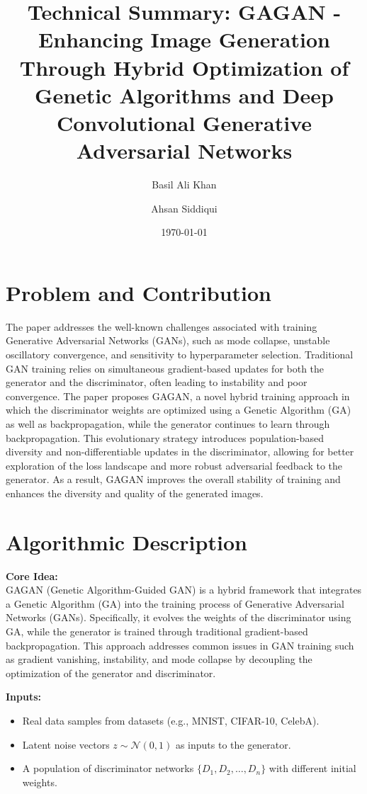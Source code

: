 \documentclass[a4paper,12pt]{article}
\title{Technical Summary: GAGAN - Enhancing Image Generation Through Hybrid Optimization of Genetic Algorithms and Deep Convolutional Generative Adversarial Networks}
\author{Basil Ali Khan \and Ahsan Siddiqui}
\date{\today}
\begin{document}
\maketitle

\section*{Problem and Contribution}
The paper addresses the well-known challenges associated with training Generative Adversarial Networks (GANs), such as  mode collapse, unstable oscillatory convergence, and sensitivity to hyperparameter selection. Traditional GAN training relies on simultaneous gradient-based updates for both the generator and the discriminator, often leading to instability and poor convergence. The paper proposes GAGAN, a novel hybrid training approach in which the discriminator weights are optimized using a Genetic Algorithm (GA) as well as backpropagation, while the generator continues to learn through backpropagation. This evolutionary strategy introduces population-based diversity and non-differentiable updates in the discriminator, allowing for better exploration of the loss landscape and more robust adversarial feedback to the generator. As a result, GAGAN improves the overall stability of training and enhances the diversity and quality of the generated images.

\section*{Algorithmic Description}

\textbf{Core Idea:} \\
GAGAN (Genetic Algorithm-Guided GAN) is a hybrid framework that integrates a Genetic Algorithm (GA) into the training process of Generative Adversarial Networks (GANs). Specifically, it evolves the weights of the discriminator using GA, while the generator is trained through traditional gradient-based backpropagation. This approach addresses common issues in GAN training such as gradient vanishing, instability, and mode collapse by decoupling the optimization of the generator and discriminator.

\vspace{0.5em}
\textbf{Inputs:}
\begin{itemize}
    \item Real data samples from datasets (e.g., MNIST, CIFAR-10, CelebA).
    \item Latent noise vectors $z \sim \mathcal{N}(0, 1)$ as inputs to the generator.
    \item A population of discriminator networks $\{D_1, D_2, \ldots, D_n\}$ with different initial weights.
\end{itemize}
\end{document}
